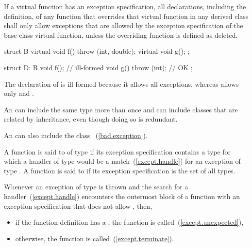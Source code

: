 \pnum
{}%
If a virtual function has an
exception specification,
all declarations, including the definition, of any function
that overrides that virtual function in any derived class
shall only allow exceptions that are allowed by the
exception specification
of the base class virtual function,
unless the overriding function is defined as deleted.
\begin{example}
\begin{codeblock}
struct B {
  virtual void f() throw (int, double);
  virtual void g();
};

struct D: B {
  void f();                     // ill-formed
  void g() throw (int);         // OK
};
\end{codeblock}

The declaration of
is ill-formed because it allows all exceptions, whereas
allows only
and
.
\end{example}

\pnum
An
can include the same type more than once
and can include classes that are related by inheritance,
even though doing so is redundant.
\begin{note} An
can also include the class
~(\ref{bad.exception}).
\end{note}

\pnum
{}%
A function is said to
of type
if
its exception specification
contains a type
for which a handler of type
would be a match~(\ref{except.handle}) for an exception of type
.
%
A function is said to 
if its exception specification
is the set of all types.

\pnum
{}%
%
Whenever an exception of type  is thrown
and the search for a handler~(\ref{except.handle})
encounters the outermost block of a function with an
exception specification that does not allow , then,

\begin{itemize}
\item if the function definition has a
, the function
 is called~(\ref{except.unexpected}),

%
%
\item otherwise, the function  is called~(\ref{except.terminate}).
\end{itemize}

